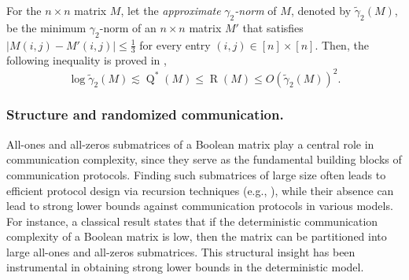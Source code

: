 \documentclass[11pt]{amsart}
\theoremstyle{plain}
\theoremstyle{definition}
\DeclareMathOperator{\R}{R}
\DeclareMathOperator{\Q}{Q}
\begin{document}
For the $n \times n$ matrix $M$, let the \emph{approximate} $\gamma_2$\emph{-norm} of $M$, denoted by $\tilde{\gamma}_2(M)$, be the minimum $\gamma_2$-norm of an $n \times n$ matrix $M'$ that satisfies $|M(i,j)-M'(i,j)|\leq \frac{1}{3}$ for every entry $(i,j)\in [n]\times [n]$. Then, the following inequality is proved in \cite{LS},
\begin{equation}\label{eq:gamma-random}
    \log \tilde{\gamma}_2(M) \lesssim \Q^{*}(M)\leq \R(M) \leq O(\tilde{\gamma}_2(M))^2.
\end{equation}

\subsubsection{Structure and randomized communication.} All-ones and all-zeros submatrices of a Boolean matrix play a central role in communication complexity, since they serve as the fundamental building blocks of communication protocols. Finding such submatrices of large size often leads to efficient protocol design via recursion techniques (e.g., \cite{nisan1995rank}), while their absence can lead to strong lower bounds against communication protocols in various models.  For instance, a classical result states that if the deterministic communication complexity of a Boolean matrix is low, then the matrix can be partitioned into large all-ones and all-zeros submatrices. This structural insight has been instrumental in obtaining strong lower bounds in the deterministic model.
\end{document}

